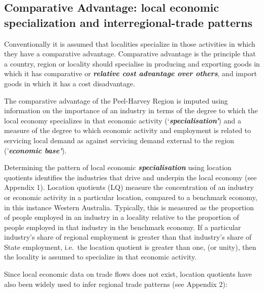 \documentclass[
]{book}
\begin{document}
\hypertarget{comparative-advantage-local-economic-specialization-and-interregional-trade-patterns}{%
\subsection{Comparative Advantage: local economic specialization and interregional-trade patterns}\label{comparative-advantage-local-economic-specialization-and-interregional-trade-patterns}}

Conventionally it is assumed that localities specialize in those activities in which they have a comparative advantage. Comparative advantage is the principle that a country, region or locality should specialise in producing and exporting goods in which it has comparative or \textbf{\emph{relative cost advantage over others}}, and import goods in which it has a cost disadvantage.~

The comparative advantage of the Peel-Harvey Region is imputed using information on the importance of an industry in terms of the degree to which the local economy specializes in that economic activity (`\textbf{\emph{specialisation'}}) and a measure of the degree to which economic activity and employment is related to servicing local demand as against servicing demand external to the region ('\textbf{\emph{economic base'}}).

Determining the pattern of local economic \textbf{\emph{specialisation}} using location quotients identifies the industries that drive and underpin the local economy (see Appendix 1). Location quotients (LQ) measure the concentration of an industry or economic activity in a particular location, compared to a benchmark economy, in this instance Western Australia. Typically, this is measured as the proportion of people employed in an industry in a locality relative to the proportion of people employed in that industry in the benchmark economy. If a particular industry's share of regional employment is greater than that industry's share of State employment, i.e.~the location quotient is greater than one, (or unity), then the locality is assumed to specialize in that economic activity.~

Since local economic data on trade flows does not exist, location quotients have also been widely used to infer regional trade patterns (see Appendix 2):~
\end{document}
